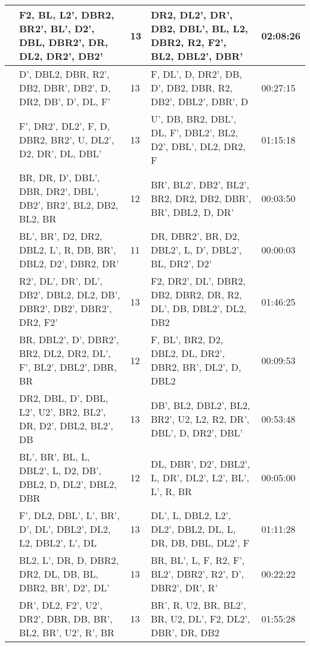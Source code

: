 \begin{table}[h]
{\begin{tabular}{|p{2cm}|p{7cm}|p{2cm}|p{7cm}|p{2.8cm}|}
 & F2, BL, L2', DBR2, BR2', BL',   D2', DBL, DBR2', DR, DL2, DR2', DB2' & 13 & DR2, DL2', DR', DB2, DBL', BL,   L2, DBR2, R2, F2', BL2, DBL2', DBR' & 02:08:26 \\ \hline
 & D', DBL2, DBR, R2', DB2, DBR',   DB2', D, DR2, DB', D', DL, F' & 13 & F, DL', D, DR2', DB, D', DB2,   DBR, R2, DB2', DBL2', DBR', D & 00:27:15 \\ \hline
 & F', DR2', DL2', F, D, DBR2,   BR2', U, DL2', D2, DR', DL, DBL' & 13 & U', DB, BR2, DBL', DL, F',   DBL2', BL2, D2', DBL', DL2, DR2, F & 01:15:18 \\ \hline
 & \cellcolor[HTML]{E2EFD9}BR, DR, D', DBL', DBR, DR2',   DBL', DB2', BR2', BL2, DB2, BL2, BR & \cellcolor[HTML]{E2EFD9}12 & \cellcolor[HTML]{E2EFD9}BR', BL2', DB2', BL2', BR2, DR2,   DB2, DBR', BR', DBL2, D, DR' & \cellcolor[HTML]{E2EFD9}00:03:50 \\ \hline
 & \cellcolor[HTML]{C5E0B3}BL', BR', D2, DR2, DBL2, L', R,   DB, BR', DBL2, D2', DBR2, DR' & \cellcolor[HTML]{C5E0B3}11 & \cellcolor[HTML]{C5E0B3}DR, DBR2', BR, D2, DBL2', L, D',   DBL2', BL, DR2', D2' & \cellcolor[HTML]{C5E0B3}00:00:03 \\ \hline
 & R2', DL', DR', DL', DB2', DBL2,   DL2, DB', DBR2', DB2', DBR2', DR2, F2' & 13 & F2, DR2', DL', DBR2, DB2, DBR2,   DR, R2, DL', DB, DBL2', DL2, DB2 & 01:46:25 \\ \hline
 & \cellcolor[HTML]{E2EFD9}BR, DBL2', D', DBR2', BR2, DL2,   DR2, DL', F', BL2', DBL2', DBR, BR & \cellcolor[HTML]{E2EFD9}12 & \cellcolor[HTML]{E2EFD9}F, BL', BR2, D2, DBL2, DL, DR2',   DBR2, BR', DL2', D, DBL2 & \cellcolor[HTML]{E2EFD9}00:09:53 \\ \hline
 & DR2, DBL, D', DBL, L2', U2',   BR2, BL2', DR, D2', DBL2, BL2', DB & 13 & DB', BL2, DBL2', BL2, BR2', U2,   L2, R2, DR', DBL', D, DR2', DBL' & 00:53:48 \\ \hline
 & \cellcolor[HTML]{E2EFD9}BL', BR', BL, L, DBL2', L, D2,   DB', DBL2, D, DL2', DBL2, DBR & \cellcolor[HTML]{E2EFD9}12 & \cellcolor[HTML]{E2EFD9}DL, DBR', D2', DBL2', L, DR',   DL2', L2', BL', L', R, BR & \cellcolor[HTML]{E2EFD9}00:05:00 \\ \hline
 & F', DL2, DBL', L', BR', D', DL',   DBL2', DL2, L2, DBL2', L', DL & 13 & DL', L, DBL2, L2', DL2', DBL2,   DL, L, DR, DB, DBL, DL2', F & 01:11:28 \\ \hline
 & BL2, L', DR, D, DBR2, DR2, DL,   DB, BL, DBR2, BR', D2', DL' & 13 & BR, BL', L, F, R2, F', BL2',   DBR2', R2', D', DBR2', DR', R' & 00:22:22 \\ \hline
 & DR', DL2, F2', U2', DR2', DBR,   DB, BR', BL2, BR', U2', R', BR & 13 & BR', R, U2, BR, BL2', BR, U2,   DL', F2, DL2', DBR', DR, DB2 & 01:55:28 \\ \hline

\end{tabular}}
\end{table}

